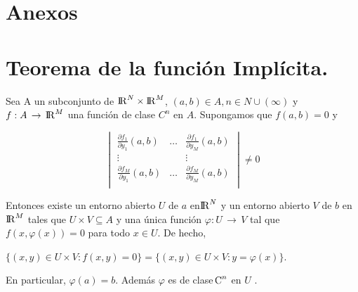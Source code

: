 \documentclass[12pt]{article}
\begin{document}
\clearpage

\section*{Anexos}
\appendix
\section{Teorema de la función Implícita.}
Sea A un subconjunto de  ${\rm I\!R} ^N \times {\rm I\!R} ^M$, $(a,b) \in A, n \in N \cup(\infty)$ y $f: A\,\to\,{\rm I\!R} ^M$ una función de clase $C^n$ en $A$. Supongamos que $f(a,b)=0$ y 

\[
\begin{vmatrix}
\frac{\partial f_{1}}{ \partial y_{1}}(a,b) & \dots & \frac{\partial f_{1}}{ \partial y_{M}}(a,b) \\
\vdots &&\vdots \\
\frac{\partial f_{M}}{ \partial y_{1}}(a,b) &\dots& \frac{\partial f_{M}}{ \partial y_{M}}(a,b) \\
\end{vmatrix}
\neq 0
\]


Entonces existe un entorno abierto $U$ de $a$ en$ {\rm I\!R} ^N$ y un entorno abierto $V$ de $b$ en  ${\rm I\!R} ^M$ tales que $U \times V \subseteq A$ y una única función $\varphi: U \,\to\, V$ tal que $f(x,\varphi(x))=0$ para todo $x \in U$. De hecho,\\
\begin{center}
$\{ (x,y)  \in U \times V: f(x,y)=0 \} =\{ (x,y)  \in U \times V: y= \varphi (x) \}$.
\end{center}
En particular, $ \varphi (a)=b$. Además  $\varphi$ es de clase ${\rm \!C} ^n$ en $U$ \cite{implicitas}.
\clearpage
\end{document}
